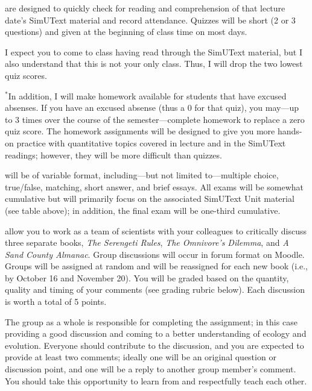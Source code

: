\documentclass{tufte-handout}
\begin{document}
\begin{fullwidth}	


 are designed to quickly check for reading and comprehension of that lecture date's SimUText material and record attendance. Quizzes will be short (2 or 3 questions) and given at the beginning of class time on most days. 

I expect you to come to class having read through the SimUText material, but I also understand that this is not your only class. Thus, I will drop the two lowest quiz scores.

$^*$In addition, I will make homework available for students that have excused absenses. If you have an excused absense (thus a 0 for that quiz), you may---up to 3 times over the course of the semester---complete homework to replace a zero quiz score. The homework assignments will be designed to give you more hands-on practice with quantitative topics covered in lecture and in the SimUText readings; however, they will be more difficult than quizzes.
	

 will be of variable format, including---but not limited to---multiple choice, true/false, matching, short answer, and brief essays. All exams will be somewhat cumulative but will primarily focus on the associated SimUText Unit material (see table above); in addition, the final exam will be one-third cumulative. 
						
												
 allow you to work as a team of scientists with your colleagues to critically discuss three separate books, \emph{The Serengeti Rules}, \emph{The Omnivore's Dilemma}, and \emph{A Sand County Almanac}. Group discussions will occur in forum format on Moodle. Groups will be assigned at random and will be reassigned for each new book 
(i.e., by October 16 and November 20). 											%
You will be graded based on the quantity, quality and timing of your comments (see grading rubric below). Each discussion is worth a total of 5 points.

The group as a whole is responsible for completing the assignment; in this case providing a good discussion and coming to a better understanding of ecology and evolution. Everyone should contribute to the discussion, and you are expected to provide at least two comments; ideally one will be an original question or discussion point, and one will be a reply to another group member's comment. You should take this opportunity to learn from and respectfully teach each other.


\end{fullwidth}
\end{document}
